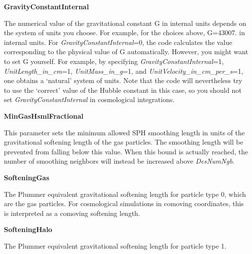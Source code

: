 \begin{DoxyItemize}
\item {\bfseries \-Gravity\-Constant\-Internal} \par
 \-The numerical value of the gravitational constant \-G in internal units depends on the system of units you choose. \-For example, for the choices above, \-G=43007. in internal units. \-For {\itshape \-Gravity\-Constant\-Internal\/}=0, the code calculates the value corresponding to the physical value of \-G automatically. \-However, you might want to set \-G yourself. \-For example, by specifying {\itshape \-Gravity\-Constant\-Internal\/}=1, {\itshape \-Unit\-Length\-\_\-in\-\_\-cm\/}=1, {\itshape \-Unit\-Mass\-\_\-in\-\_\-g\/}=1, and {\itshape \-Unit\-Velocity\-\_\-in\-\_\-cm\-\_\-per\-\_\-s\/}=1, one obtains a `natural' system of units. \-Note that the code will nevertheless try to use the `correct' value of the \-Hubble constant in this case, so you should not set {\itshape \-Gravity\-Constant\-Internal\/} in cosmological integrations.
\end{DoxyItemize}


\begin{DoxyItemize}
\item {\bfseries \-Min\-Gas\-Hsml\-Fractional} \par
 \-This parameter sets the minimum allowed \-S\-P\-H smoothing length in units of the gravitational softening length of the gas particles. \-The smoothing length will be prevented from falling below this value. \-When this bound is actually reached, the number of smoothing neighbors will instead be increased above {\itshape \-Des\-Num\-Ngb\/}.
\end{DoxyItemize}


\begin{DoxyItemize}
\item {\bfseries \-Softening\-Gas} \par
 \-The \-Plummer equivalent gravitational softening length for particle type 0, which are the gas particles. \-For cosmological simulations in comoving coordinates, this is interpreted as a comoving softening length.
\end{DoxyItemize}


\begin{DoxyItemize}
\item {\bfseries \-Softening\-Halo} \par
 \-The \-Plummer equivalent gravitational softening length for particle type 1.
\end{DoxyItemize}


